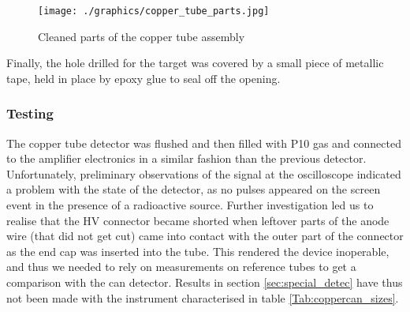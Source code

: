 \begin{figure}[h]
  \centering
  \texttt{[image: ./graphics/copper\_tube\_parts.jpg]}
  \caption{Cleaned parts of the copper tube assembly}
  \label{fig:copper_parts}
\end{figure}

Finally, the hole drilled for the target was covered by a small piece of metallic tape, held in place by epoxy glue to seal off the opening.

\subsubsection{Testing}

The copper tube detector was flushed and then filled with P10 gas and connected to the amplifier electronics in a similar fashion than the previous detector. Unfortunately, preliminary observations of the signal at the oscilloscope indicated a problem with the state of the detector, as no pulses appeared on the screen event in the presence of a radioactive source. Further investigation led us to realise that the HV connector became shorted when leftover parts of the anode wire (that did not get cut) came into contact with the outer part of the connector as the end cap was inserted into the tube. This rendered the device inoperable, and thus we needed to rely on measurements on reference tubes to get a comparison with the can detector. Results in section \ref{sec:special_detec} have thus not been made with the instrument characterised in table \ref{Tab:coppercan_sizes}.

